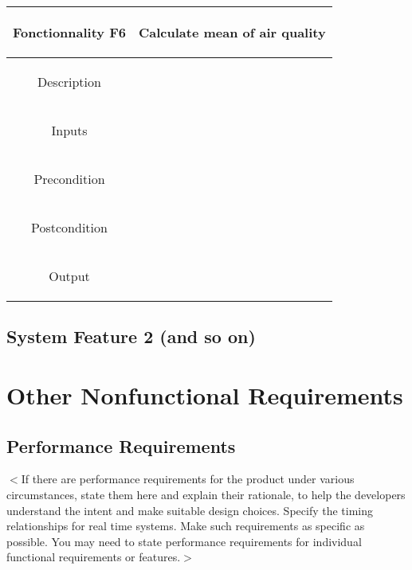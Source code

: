 \documentclass{report}
\begin{document}
\begin{center}
	\begin{tabular}{|c|c|}
	\hline
	\begin{bf}Fonctionnality F6\end{bf} & \begin{bf}Calculate mean of air quality\end{bf} \\
	\hline
	\begin{bf}Description\end{bf} & \begin{bf}\end{bf}  \\
	\hline
	\begin{bf}Inputs\end{bf} & \begin{bf}\end{bf} \\
	\hline
	\begin{bf}Precondition\end{bf} & \begin{bf}\end{bf}  \\
	\hline
	\begin{bf}Postcondition\end{bf} & \begin{bf}\end{bf} \\
	\hline
	\begin{bf}Output\end{bf} & \begin{bf}\end{bf} \\
	\hline
	\end{tabular}
\end{center}

\section{System Feature 2 (and so on)}


\chapter{Other Nonfunctional Requirements}

\section{Performance Requirements}
$<$If there are performance requirements for the product under various
circumstances, state them here and explain their rationale, to help the
developers understand the intent and make suitable design choices. Specify the
timing relationships for real time systems. Make such requirements as specific
as possible. You may need to state performance requirements for individual
functional requirements or features.$>$
\end{document}
